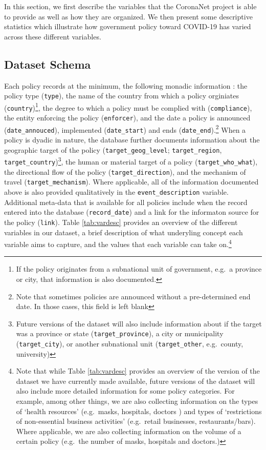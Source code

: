 \documentclass[]{article}
\let\rmarkdownfootnote\footnote%
\def\footnote{\protect\rmarkdownfootnote}
\begin{document}
In this section, we first describe the variables that the CoronaNet project is able to provide as well as how they are organized. We then present some descriptive statistics which illustrate how government policy toward COVID-19 has varied across these different variables.

\hypertarget{dataset-schema}{%
\subsection{Dataset Schema}\label{dataset-schema}}

Each policy records at the minimum, the following monadic information : the policy type (\texttt{type}), the name of the country from which a policy orginiates (\texttt{country})\footnote{If the policy originates from a subnational unit of government, e.g.~a province or city, that information is also documented.}, the degree to which a policy must be complied with (\texttt{compliance}), the entity enforcing the policy (\texttt{enforcer}), and the date a policy is announced (\texttt{date\_annouced}), implemented (\texttt{date\_start}) and ends (\texttt{date\_end}).\footnote{Note that sometimes policies are announced without a pre-determined end date. In those cases, this field is left blank} When a policy is dyadic in nature, the database further documents information about the geographic target of the policy (\texttt{target\_geog\_level}; \texttt{target\_region}, \texttt{target\_country})\footnote{Future versions of the dataset will also include information about if the target was a province or state (\texttt{target\_province}), a city or municipality (\texttt{target\_city}), or another subnational unit (\texttt{target\_other}, e.g.~county, university)}, the human or material target of a policy (\texttt{target\_who\_what}), the directional flow of the policy (\texttt{target\_direction}), and the mechanism of travel (\texttt{target\_mechanism}). Where applicable, all of the information documented above is also provided qualitatively in the \texttt{event\_description} variable. Additional meta-data that is available for all policies include when the record entered into the database (\texttt{record\_date}) and a link for the informaton source for the policy (\texttt{link}). Table \ref{tab:vardesc} provides an overview of the different variables in our dataset, a brief description of what underyling concept each variable aims to capture, and the values that each variable can take on.\footnote{Note that while Table \ref{tab:vardesc} provides an overview of the version of the dataset we have currently made available, future versions of the dataset will also include more detailed information for some policy categories. For example, among other things, we are also collecting information on the types of `health resources' (e.g.~masks, hospitals, doctors ) and types of `restrictions of non-essential business activities' (e.g.~retail businesses, restaurants/bars). Where applicable, we are also collecting information on the volume of a certain policy (e.g.~the number of masks, hospitals and doctors.)}
\end{document}

